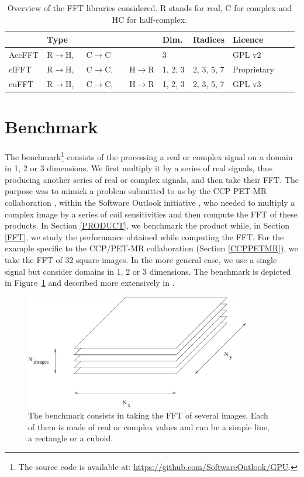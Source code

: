 \documentclass[12pt, a4paper]{article}
\begin{document}
\begin{table}[H]
\captionsetup{width=0.8\textwidth}
\centering
\begin{tabular}{|p{2.5cm}||p{2.5cm}|p{1cm}|p{3cm}|p{3cm}|p{2cm}|p{2cm}|}
\hline
& Type & Dim. & Radices & Licence \\
\hline
\hline
AccFFT & R$\to$H,\ \ \  C$\to$C& 3& & GPL v2\\
\hline
clFFT  &  R$\to$H,\ \ \  C$\to$C,\ \ \ \  H$\to$R& 1, 2, 3 & 2, 3, 5, 7 & Proprietary\\
\hline
cuFFT  &  R$\to$H,\ \ \  C$\to$C,\ \ \ \  H$\to$R & 1, 2, 3 & 2, 3, 5, 7 & GPL v3\\
\hline
\end{tabular}
\caption{Overview of the FFT libraries considered. R stands for real, C for complex and HC for half-complex.}
\label{ffttable}
\end{table}

\section{Benchmark}
The benchmark\footnote{The source code is available at:
  \hyperlink{https://github.com/SoftwareOutlook/GPU}{https://github.com/SoftwareOutlook/GPU}.}
consists of the processing a real or complex signal on a domain in 1, 2 or
3 dimensions. We first multiply it by a series of real signals, thus
producing another series of real or complex signals, and then take
their FFT.  The purpose was to mimick a problem submitted to us by the
CCP PET-MR collaboration \cite{ccppetmr}, within the Software Outlook
initiative \cite{softwareoutlook}, who needed to multiply a complex
image by a series of coil sensitivities and then compute the FFT of
these products. In Section \ref{PRODUCT}, we benchmark the product
while, in Section \ref{FFT}, we study the performance obtained while
computing the FFT. For the example specific to the CCP/PET-MR
collaboration (Section \ref{CCPPETMR}), we take the FFT of 32 square
images. In the more general case, we use a single signal but consider
domains in 1, 2 or 3 dimensions. The benchmark is depicted in
Figure~\ref{benchmark} and described more extensively in
\cite{FFTREPORT}.

\begin{figure}[H]
\captionsetup{width=0.6\textwidth}
\centering
\includegraphics[height=5cm]{benchmark.pdf}
\caption{The benchmark consists in taking the FFT of several images. Each of them is made of real or complex values and can be a simple line, a rectangle or a cuboid.}
\label{benchmark}
\end{figure}
\end{document}
